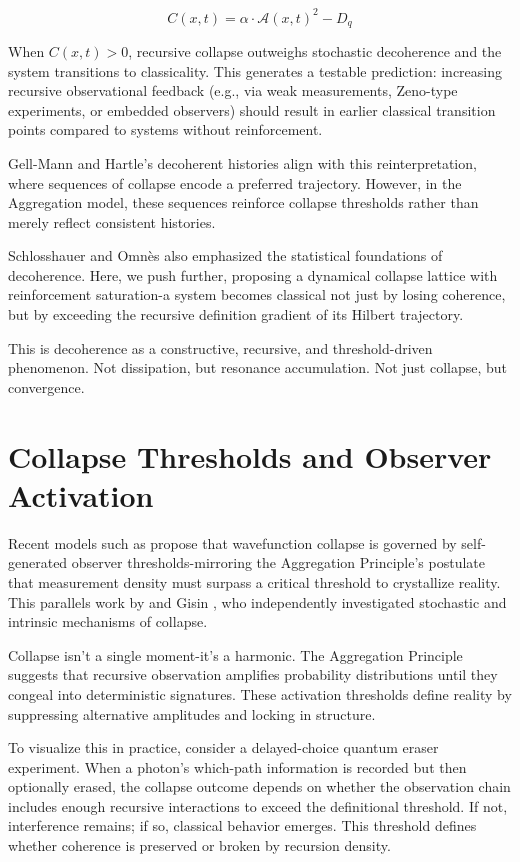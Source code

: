 \[ C(x,t) = \alpha \cdot \mathcal{A}(x,t)^2 - D_q \]

When \( C(x,t) > 0 \), recursive collapse outweighs stochastic decoherence and the system transitions to classicality. This generates a testable prediction: increasing recursive observational feedback (e.g., via weak measurements, Zeno-type experiments, or embedded observers) should result in earlier classical transition points compared to systems without reinforcement.

Gell-Mann and Hartle’s decoherent histories \cite{aggregation_decoherence_core} align with this reinterpretation, where sequences of collapse encode a preferred trajectory. However, in the Aggregation model, these sequences reinforce collapse thresholds rather than merely reflect consistent histories.

Schlosshauer \cite{aggregation_decoherence_core} and Omnès \cite{aggregation_decoherence_core} also emphasized the statistical foundations of decoherence. Here, we push further, proposing a dynamical collapse lattice with reinforcement saturation-a system becomes classical not just by losing coherence, but by exceeding the recursive definition gradient of its Hilbert trajectory.

This is decoherence as a constructive, recursive, and threshold-driven phenomenon. Not dissipation, but resonance accumulation. Not just collapse, but convergence.

\section{Collapse Thresholds and Observer Activation}

Recent models such as \cite{aggregation_stochastic_collapse} propose that wavefunction collapse is governed by self-generated observer thresholds-mirroring the Aggregation Principle’s postulate that measurement density must surpass a critical threshold to crystallize reality. This parallels work by \cite{aggregation_stochastic_collapse} and Gisin \cite{aggregation_decoherence_core}, who independently investigated stochastic and intrinsic mechanisms of collapse.

Collapse isn’t a single moment-it’s a harmonic. The Aggregation Principle suggests that recursive observation amplifies probability distributions until they congeal into deterministic signatures. These activation thresholds define reality by suppressing alternative amplitudes and locking in structure.

To visualize this in practice, consider a delayed-choice quantum eraser experiment. When a photon’s which-path information is recorded but then optionally erased, the collapse outcome depends on whether the observation chain includes enough recursive interactions to exceed the definitional threshold. If not, interference remains; if so, classical behavior emerges. This threshold defines whether coherence is preserved or broken by recursion density.

